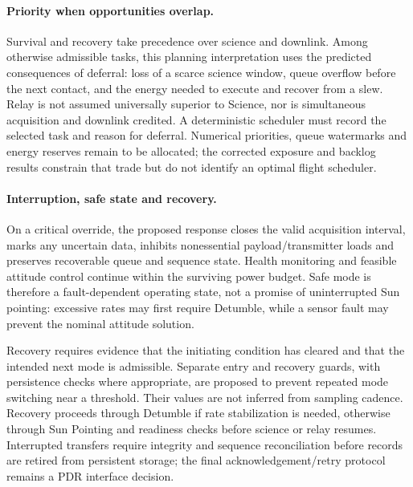 \paragraph{Priority when opportunities overlap.}
Survival and recovery take precedence over science and downlink. Among otherwise admissible tasks, this planning interpretation uses the predicted consequences of deferral: loss of a scarce science window, queue overflow before the next contact, and the energy needed to execute and recover from a slew. Relay is not assumed universally superior to Science, nor is simultaneous acquisition and downlink credited. A deterministic scheduler must record the selected task and reason for deferral. Numerical priorities, queue watermarks and energy reserves remain to be allocated; the corrected exposure and backlog results constrain that trade but do not identify an optimal flight scheduler.

\paragraph{Interruption, safe state and recovery.}
On a critical override, the proposed response closes the valid acquisition interval, marks any uncertain data, inhibits nonessential payload/transmitter loads and preserves recoverable queue and sequence state. Health monitoring and feasible attitude control continue within the surviving power budget. Safe mode is therefore a fault-dependent operating state, not a promise of uninterrupted Sun pointing: excessive rates may first require Detumble, while a sensor fault may prevent the nominal attitude solution.

Recovery requires evidence that the initiating condition has cleared and that the intended next mode is admissible. Separate entry and recovery guards, with persistence checks where appropriate, are proposed to prevent repeated mode switching near a threshold. Their values are not inferred from sampling cadence. Recovery proceeds through Detumble if rate stabilization is needed, otherwise through Sun Pointing and readiness checks before science or relay resumes. Interrupted transfers require integrity and sequence reconciliation before records are retired from persistent storage; the final acknowledgement/retry protocol remains a PDR interface decision.

